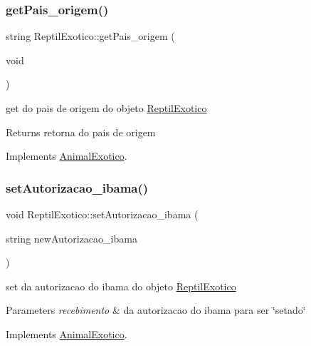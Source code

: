 \subsubsection{\texorpdfstring{getPais\_origem()}{getPais\_origem()}}
{\footnotesize\ttfamily string Reptil\+Exotico\+::get\+Pais\+\_\+origem (\begin{DoxyParamCaption}\item[{void}]{ }\end{DoxyParamCaption})\hspace{0.3cm}{\ttfamily [virtual]}}



get do pais de origem do objeto \mbox{\hyperlink{class_reptil_exotico}{Reptil\+Exotico}} 

\begin{DoxyReturn}{Returns}
retorna do pais de origem 
\end{DoxyReturn}


Implements \mbox{\hyperlink{class_animal_exotico}{Animal\+Exotico}}.

\mbox{\label{class_reptil_exotico_ad53187fb7660b938ab84d7461c06c811}} 
\subsubsection{\texorpdfstring{setAutorizacao\_ibama()}{setAutorizacao\_ibama()}}
{\footnotesize\ttfamily void Reptil\+Exotico\+::set\+Autorizacao\+\_\+ibama (\begin{DoxyParamCaption}\item[{string}]{new\+Autorizacao\+\_\+ibama }\end{DoxyParamCaption})\hspace{0.3cm}{\ttfamily [virtual]}}



set da autorizacao do ibama do objeto \mbox{\hyperlink{class_reptil_exotico}{Reptil\+Exotico}} 


\begin{DoxyParams}{Parameters}
{\em recebimento} & da autorizacao do ibama para ser \char`\"{}setado\char`\"{} \\
\hline
\end{DoxyParams}


Implements \mbox{\hyperlink{class_animal_exotico_a3931a6cc8ae2d7d8e1efd6e399a63bf7}{Animal\+Exotico}}.


